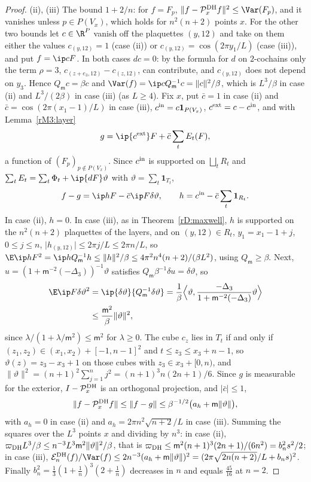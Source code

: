 \begin{proof}
(ii), (iii) The bound $1+2/n$: for $f=F_p$, $\lVert f-\mathcal P^{\rm DH}_x
f\rVert^2\le\Var(F_p)$, and it vanishes unless $p\in P(V_x)$, which holds
for $n^2(n+2)$ points $x$. For the other two bounds let $c\in\R^P$ vanish
off the plaquettes $(y,12)$ and take on them either the values $c_{(y,12)}=
1$ (case (ii)) or $c_{(y,12)}=\cos(2\pi y_1/L)$ (case (iii)), and put $f=
\ip cF$. In both cases $dc=0$: by the formula for $d$ on $2$-cochains only
the term $\rho=3$, $c_{(z+e_3,12)}-c_{(z,12)}$, can contribute, and $c_{(y,
12)}$ does not depend on $y_3$. Hence $Q_{\mathsf m}c=\beta c$ and $\Var(f)=
\ip c{Q_{\mathsf m}^{-1}c}=\lVert c\rVert^2/\beta$, which is $L^3/\beta$ in
case (ii) and $L^3/(2\beta)$ in case (iii) (as $L\ge4$). Fix $x$, put $\bar
c=1$ in case (ii) and $\bar c=\cos(2\pi(x_1-1)/L)$ in case (iii),
$c^{\rm in}=c\mathbf 1_{P(V_x)}$,
$c^{\rm ext}=c-c^{\rm in}$, and with Lemma~\ref{rM3:layer}
\[
g=\ip{c^{\rm ext}}F+\bar c\sum_tE_t(F),
\]
a function of $(F_p)_{p\notin P(V_x)}$. Since $c^{\rm in}$ is supported on
$\bigsqcup_tR_t$ and $\sum_tE_t=\sum_t\Phi_t+\ip{dF}\vartheta$ with $\vartheta=\sum_t
\mathbf 1_{T_t}$,
\[
f-g=\ip hF-\bar c\ip F{\delta\vartheta},\qquad h=c^{\rm in}-\bar c\sum_t\mathbf 1_{R_t}.
\]
In case (ii), $h=0$. In case (iii), as in Theorem~\ref{rD:maxwell}, $h$
is supported on the $n^2(n+2)$ plaquettes of the layers, and on $(y,12)\in
R_t$, $y_1=x_1-1+j$, $0\le j\le n$, $\lvert h_{(y,12)}\rvert\le2\pi j/L\le2\pi
n/L$, so $\E\ip hF^2=\ip h{Q_{\mathsf m}^{-1}h}\le\lVert h\rVert^2/\beta\le
4\pi^2n^4(n+2)/(\beta L^2)$, using $Q_{\mathsf m}\ge\beta$. Next, $u=(1+\mathsf m^{-2}(-\Delta_3))^{-1}\vartheta$ satisfies
$Q_{\mathsf m}\beta^{-1}\delta u=\delta\vartheta$, so
\begin{align*}
\E\ip F{\delta\vartheta}^2&=\ip{\delta\vartheta}{Q_{\mathsf m}^{-1}\delta\vartheta}=\frac1
\beta\Bigl\langle\vartheta,\frac{-\Delta_3}{1+\mathsf m^{-2}(-\Delta_3)}\vartheta
\Bigr\rangle\\
&\le\frac{\mathsf m^2}\beta\lVert\vartheta\rVert^2,
\end{align*}
since $\lambda/(1+\lambda/\mathsf m^2)\le\mathsf m^2$ for $\lambda\ge0$. The
cube $c_z$ lies in $T_t$ if and only if $(z_1,z_2)\in(x_1,x_2)+[-1,n-1]^2$
and $t\le z_3\le x_3+n-1$, so $\vartheta(z)=z_3-x_3+1$ on those cubes with $z_3\in
x_3+[0,n)$, and $\lVert\vartheta\rVert^2=(n+1)^2\sum_{j=1}^nj^2=(n+1)^3n(2n+1)/6$.
Since $g$ is measurable for the exterior, $I-\mathcal P^{\rm DH}_x$ is an
orthogonal projection, and $\lvert\bar c\rvert\le1$,
\[
\lVert f-\mathcal P^{\rm DH}_xf\rVert\le\lVert f-g\rVert\le\beta^{-1/2}
\bigl(a_h+\mathsf m\lVert\vartheta\rVert\bigr),
\]
with $a_h=0$ in case (ii) and $a_h=2\pi n^2\sqrt{n+2}/L$ in case (iii).
Summing the squares over the $L^3$ points $x$ and dividing by $n^3$: in
case (ii), $\varpi_{\rm DH}L^3/\beta\le n^{-3}L^3\mathsf m^2\lVert\vartheta
\rVert^2/\beta$, that is $\varpi_{\rm DH}\le\mathsf m^2(n+1)^3(2n+1)/(6n^2)=
b_n^2s^2/2$; in case (iii), $\mathcal E^{\rm DH}_n(f)/\Var(f)\le2n^{-3}(a_h+
\mathsf m\lVert\vartheta\rVert)^2=(2\pi\sqrt{2n(n+2)}/L+b_ns)^2$. Finally $b_n^2=
\frac13(1+\frac1n)^3(2+\frac1n)$ decreases in $n$ and equals $\frac{45}{16}$
at $n=2$.
\end{proof}


